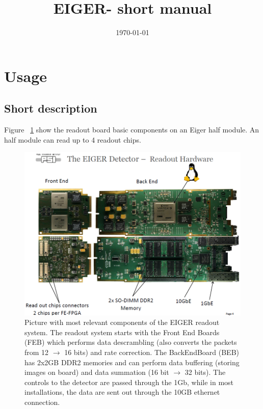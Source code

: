 \documentclass{article}
\newcommand{\E}{EIGER\xspace}
\begin{document}
\title{\E - short manual}
\date{\today}
\maketitle
\tableofcontents

\section{Usage}
\subsection{Short description}
Figure ~\ref{boards} show the readout board basic components on an Eiger half module. An half module can read up to 4 readout chips.  
\begin{figure}[t]
\begin{center}
\includegraphics[width=1\textwidth]{Boards}
\end{center}
\caption{Picture with most relevant components of the EIGER readout system. The readout system starts with the Front End Boards (FEB) which performs data descrambling (also converts the packets from 12 $\to$ 16 bits) and rate correction. The BackEndBoard (BEB) has 2x2GB DDR2 memories and can perform data buffering (storing images on board) and data summation (16 bit $\to$ 32 bits). The controls to the detector are passed through the 1Gb, while in most installations, the data are sent out through the 10GB ethernet connection.} 
\label{boards}
\end{figure}
\end{document}
